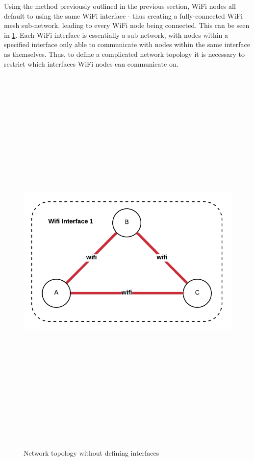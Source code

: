 Using the method previously outlined in the previous section, WiFi nodes all default to using the same WiFi interface - thus creating a fully-connected WiFi mesh sub-network, leading to every WiFi node being connected. 
This can be seen in \figurename{ \ref{fig:networkWifi1}}.
Each WiFi interface is essentially a sub-network, with nodes within a specified interface only able to communicate with nodes within the same interface as themselves.
Thus, to define a complicated network topology it is necessary to restrict which interfaces WiFi nodes can communicate on.

\begin{figure}
    \begin{centering}
        \includegraphics[width=14cm,height=20cm,keepaspectratio]{Figures/networkWifiInterface1.png}
        \caption{Network topology without defining interfaces}
        \label{fig:networkWifi1}
    \end{centering}
\end{figure}


